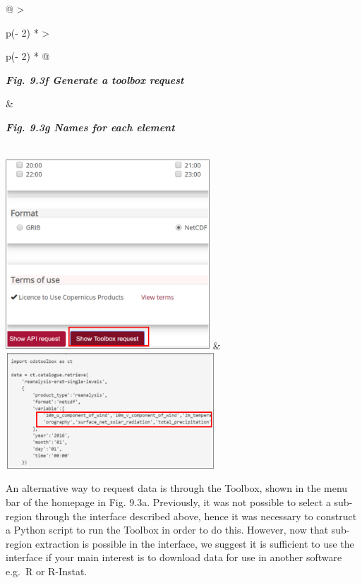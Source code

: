 \documentclass[
  letterpaper,
  DIV=11,
  numbers=noendperiod]{scrreprt}
\begin{document}
\begin{longtable}[]{@{}
  >{\raggedright\arraybackslash}p{(\columnwidth - 2\tabcolsep) * }
  >{\raggedright\arraybackslash}p{(\columnwidth - 2\tabcolsep) * }@{}}
\toprule\noalign{}
\begin{minipage}[b]{\linewidth}\raggedright
\textbf{\emph{Fig. 9.3f Generate a toolbox request}}
\end{minipage} & \begin{minipage}[b]{\linewidth}\raggedright
\textbf{\emph{Fig. 9.3g Names for each element}}
\end{minipage} \\
\midrule\noalign{}
\endhead
\bottomrule\noalign{}
\endlastfoot
\includegraphics[width=3.01201in,height=2.82714in]{figures/Fig9.3f.png}
&
\includegraphics[width=3.09386in,height=1.70554in]{figures/Fig9.3g.png} \\
\end{longtable}

An alternative way to request data is through the Toolbox, shown in the
menu bar of the homepage in Fig. 9.3a. Previously, it was not possible
to select a sub-region through the interface described above, hence it
was necessary to construct a Python script to run the Toolbox in order
to do this. However, now that sub-region extraction is possible in the
interface, we suggest it is sufficient to use the interface if your main
interest is to download data for use in another software e.g.~R or
R-Instat.
\end{document}
